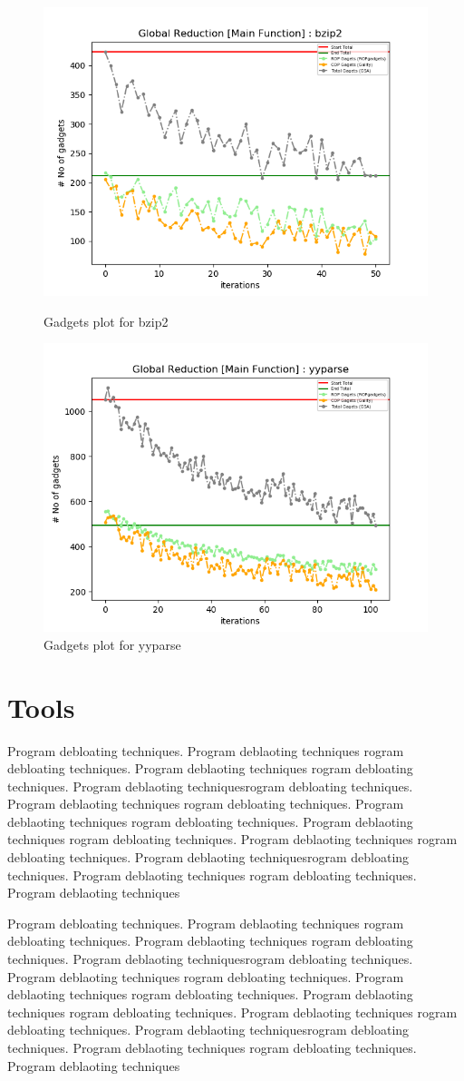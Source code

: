 \documentclass{relatorio}
\begin{document}
\begin{figure}[H]
		\includegraphics[width=0.65\linewidth]{imgs/chisel_gadgets_bzip2_plot.png}
		\caption{Gadgets plot for \color{blue} bzip2}%
		\label{fig:plant}
		\centering
		\captionsetup{justification=centering}
		\includegraphics[width=0.65\linewidth]{imgs/chisel_gadgets_yyparse_plot.png}
		\caption{Gadgets plot for \color{blue} yyparse}%
		\label{fig:plant}
	\end{figure}
	\section{Tools}%
\label{Tools}

Program debloating techniques. Program deblaoting techniques rogram debloating techniques. Program deblaoting techniques
rogram debloating techniques. Program deblaoting techniquesrogram debloating techniques. Program deblaoting techniques
rogram debloating techniques. Program deblaoting techniques rogram debloating techniques. Program deblaoting techniques
rogram debloating techniques. Program deblaoting techniques 
rogram debloating techniques. Program deblaoting techniquesrogram debloating techniques. Program deblaoting techniques
rogram debloating techniques. Program deblaoting techniques

Program debloating techniques. Program deblaoting techniques rogram debloating techniques. Program deblaoting techniques
rogram debloating techniques. Program deblaoting techniquesrogram debloating techniques. Program deblaoting techniques
rogram debloating techniques. Program deblaoting techniques rogram debloating techniques. Program deblaoting techniques
rogram debloating techniques. Program deblaoting techniques 
rogram debloating techniques. Program deblaoting techniquesrogram debloating techniques. Program deblaoting techniques
rogram debloating techniques. Program deblaoting techniques
\end{document}
